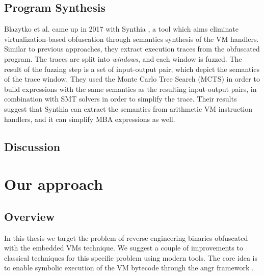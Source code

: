 \section{Program Synthesis}

Blazytko et al. came up in 2017 with Synthia \cite{blazytko2017}, a tool which aims eliminate virtualization-based obfuscation through semantics synthesis of the \gls{VM} handlers. Similar to previous approaches, they extract execution traces from the obfuscated program. The traces are split into \emph{windows}, and each window is fuzzed. The result of the fuzzing step is a set of input-output pair, which depict the semantics of the trace window. They used the Monte Carlo Tree Search (MCTS) in order to build expressions with the same semantics as the resulting input-output pairs, in combination with SMT solvers in order to simplify the trace. Their results suggest that Synthia can extract the semantics from arithmetic \gls{VM} instruction handlers, and it can simplify \gls{MBA} expressions as well.

\section{Discussion}





\chapter{Our approach}

\section{Overview}

In this thesis we target the problem of reverse engineering binaries obfuscated with the embedded \glspl{VM} technique. We suggest a couple of improvements to classical techniques for this specific problem using modern tools. The core idea is to enable symbolic execution of the VM bytecode through the angr framework \cite{angr}. 


